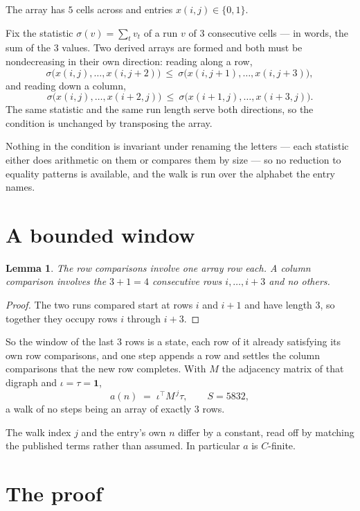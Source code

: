 \documentclass[11pt,a4paper]{article}
\theoremstyle{plain}
\newtheorem{lemma}[theorem]{Lemma}
\theoremstyle{definition}
\begin{document}
The array has $5$ cells across and entries $x(i,j)\in\{0,1\}$.

Fix the statistic $\sigma(v)=\sum_{t} v_t$ of a run $v$ of $3$ consecutive cells --- in words,
the sum of the $3$ values. Two derived arrays are formed and both must be
nondecreasing in their own direction: reading along a row,
\[
\sigma\bigl(x(i,j),\dots,x(i,j{+}2)\bigr)\ \le\
\sigma\bigl(x(i,j{+}1),\dots,x(i,j{+}3)\bigr),
\]
and reading down a column,
\[
\sigma\bigl(x(i,j),\dots,x(i{+}2,j)\bigr)\ \le\
\sigma\bigl(x(i{+}1,j),\dots,x(i{+}3,j)\bigr).
\]
The same statistic and the same run length serve both directions, so the condition is
unchanged by transposing the array.

Nothing in the condition is invariant under renaming the letters --- each statistic either does
arithmetic on them or compares them by size --- so no reduction to equality patterns is
available, and the walk is run over the alphabet the entry names.

\section{A bounded window}

\begin{lemma}\label{lem:win}
The row comparisons involve one array row each. A column comparison involves the
$3+1=4$ consecutive rows $i,\dots,i{+}3$ and no others.
\end{lemma}

\begin{proof}
The two runs compared start at rows $i$ and $i+1$ and have length $3$, so together they
occupy rows $i$ through $i+3$.
\end{proof}

So the window of the last $3$ rows is a state, each row of it already satisfying its own row
comparisons, and one step appends a row and settles the column comparisons that the new row
completes. With $M$ the adjacency matrix of that digraph and $\iota=\tau=\mathbf{1}$,
\[
a(n)\;=\;\iota^{\!\top}M^{\,j}\tau ,\qquad S=5832,
\]
a walk of no steps being an array of exactly $3$ rows.

The walk index $j$ and the entry's own $n$ differ by a constant, read off by matching the
published terms rather than assumed. In particular $a$ is $C$-finite.

\section{The proof}
\end{document}
